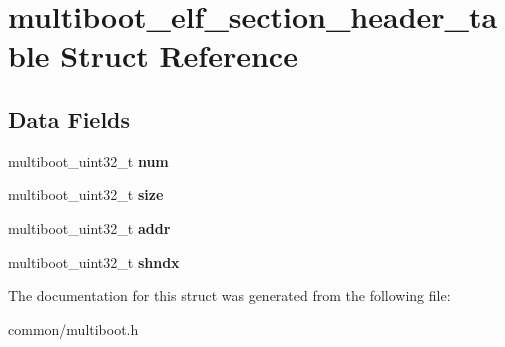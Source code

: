 \hypertarget{structmultiboot__elf__section__header__table}{}\section{multiboot\+\_\+elf\+\_\+section\+\_\+header\+\_\+table Struct Reference}
\label{structmultiboot__elf__section__header__table}
\subsection*{Data Fields}
\begin{DoxyCompactItemize}
\item 
multiboot\+\_\+uint32\+\_\+t {\bfseries num}\hypertarget{structmultiboot__elf__section__header__table_ac7a3ee82a45af6c3c10413de7620eec2}{}\label{structmultiboot__elf__section__header__table_ac7a3ee82a45af6c3c10413de7620eec2}

\item 
multiboot\+\_\+uint32\+\_\+t {\bfseries size}\hypertarget{structmultiboot__elf__section__header__table_a87bed62f532b2e2e73ab41df40069e2a}{}\label{structmultiboot__elf__section__header__table_a87bed62f532b2e2e73ab41df40069e2a}

\item 
multiboot\+\_\+uint32\+\_\+t {\bfseries addr}\hypertarget{structmultiboot__elf__section__header__table_ad0c7bb0937470de83f3319015416614a}{}\label{structmultiboot__elf__section__header__table_ad0c7bb0937470de83f3319015416614a}

\item 
multiboot\+\_\+uint32\+\_\+t {\bfseries shndx}\hypertarget{structmultiboot__elf__section__header__table_adfc74c974ba232064320ba57a02d0fb3}{}\label{structmultiboot__elf__section__header__table_adfc74c974ba232064320ba57a02d0fb3}

\end{DoxyCompactItemize}


The documentation for this struct was generated from the following file\+:\begin{DoxyCompactItemize}
\item 
common/multiboot.\+h\end{DoxyCompactItemize}
